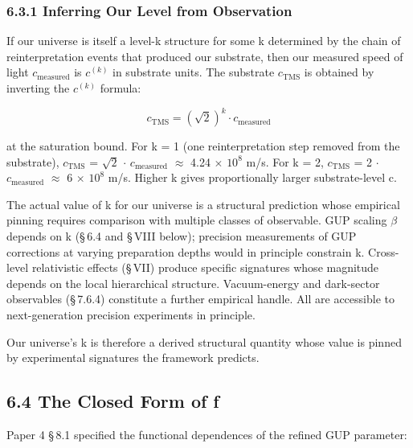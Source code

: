 \documentclass[11pt,oneside]{report}
\theoremstyle{definition}
\theoremstyle{remark}
\begin{document}
\subsubsection*{6.3.1 Inferring Our Level from Observation}

If our universe is itself a level-k structure for some k determined by
the chain of reinterpretation events that produced our substrate, then
our measured speed of light \ensuremath{c_{\mathrm{measured}}} is \ensuremath{c^{(k)}} in substrate units.
The substrate \ensuremath{c_{\mathrm{TMS}}} is obtained by inverting the \ensuremath{c^{(k)}} formula:

\begin{equation*}
c_{\mathrm{TMS}} = (\sqrt{2})^{k} \cdot c_{\mathrm{measured}}
\end{equation*}

at the saturation bound. For k = 1 (one reinterpretation step removed
from the substrate), \ensuremath{c_{\mathrm{TMS}}} = \ensuremath{\sqrt{2}} \ensuremath{\cdot} \ensuremath{c_{\mathrm{measured}}} \ensuremath{\approx} 4.24 \ensuremath{\times} \ensuremath{10^{8}} m/s. For k =
2, \ensuremath{c_{\mathrm{TMS}}} = 2 \ensuremath{\cdot} \ensuremath{c_{\mathrm{measured}}} \ensuremath{\approx} 6 \ensuremath{\times} \ensuremath{10^{8}} m/s. Higher k gives proportionally
larger substrate-level c.

The actual value of k for our universe is a structural prediction whose
empirical pinning requires comparison with multiple classes of
observable. GUP scaling \ensuremath{\beta} depends on k (\S\,6.4 and \S\,VIII below); precision
measurements of GUP corrections at varying preparation depths would in
principle constrain k. Cross-level relativistic effects (\S\,VII) produce
specific signatures whose magnitude depends on the local hierarchical
structure. Vacuum-energy and dark-sector observables (\S\,7.6.4) constitute
a further empirical handle. All are accessible to next-generation
precision experiments in principle.

Our universe's k is therefore a derived structural quantity whose value
is pinned by experimental signatures the framework predicts.

\subsection*{6.4 The Closed Form of f}

Paper 4 \S\,8.1 specified the functional dependences of the refined GUP
parameter:
\end{document}
